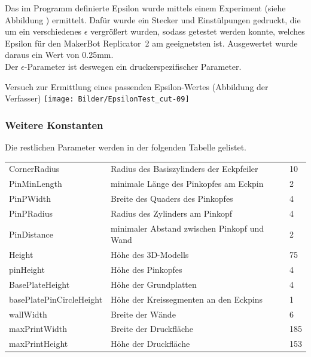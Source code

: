 Das im Programm definierte Epsilon wurde mittels einem Experiment (siehe Abbildung \thebildnrnext) ermittelt.
Dafür wurde ein Stecker und Einstülpungen gedruckt, die um ein verschiedenes {\Large$\epsilon$} vergrößert wurden, sodass getestet werden konnte, welches Epsilon für den MakerBot Replicator\texttrademark\ 2 am geeignetsten ist.
Ausgewertet wurde daraus ein Wert von 0.25mm. \\
Der {\Large$\epsilon$}-Parameter ist deswegen ein druckerspezifischer Parameter.

\begin{Bild}{Versuch zur Ermittlung eines passenden Epsilon-Wertes (Abbildung der Verfasser)}
		\texttt{[image: Bilder/EpsilonTest\_cut-09]}
\end{Bild}

\subsubsection{Weitere Konstanten}
Die restlichen Parameter werden in der folgenden Tabelle gelistet. \\

\begin{tabularx}{\textwidth}{|X|X|Z|}
	\hline
	 &  &  \\ 
	\hline
	CornerRadius & Radius des Basiszylinders der Eckpfeiler & 10 \\ 
	\hline 
	PinMinLength & minimale Länge des Pinkopfes am Eckpin & 2 \\ 
	\hline 
	PinPWidth & Breite des Quaders des Pinkopfes & 4 \\ 
	\hline 
	PinPRadius & Radius des Zylinders am Pinkopf & 4 \\ 
	\hline 
	PinDistance & minimaler Abstand zwischen Pinkopf und Wand & 2 \\ 
	\hline 
	Height & Höhe des 3D-Modells & 75 \\ 
	\hline 
	pinHeight & Höhe des Pinkopfes & 4 \\ 
	\hline 
	BasePlateHeight & Höhe der Grundplatten & 4 \\ 
	\hline 
	\hspace{0pt}
	basePlatePinCircleHeight & Höhe der Kreissegmenten an den Eckpins & 1 \\ 
	\hline 
	wallWidth & Breite der Wände & 6 \\ 
	\hline 
	maxPrintWidth & Breite der Druckfläche & 185 \\ 
	\hline 
	maxPrintHeight & Höhe der Druckfläche & 153 \\  
	\hline
\end{tabularx}

